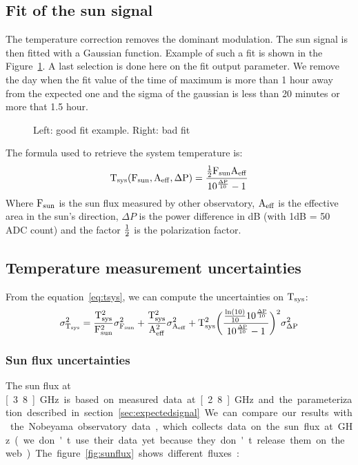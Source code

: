 \subsection{Fit of the sun signal}
The temperature  correction removes the dominant  modulation.  The sun
signal is then fitted with a  Gaussian function. Example of such a fit
is shown in the  Figure~\ref{fig:examplefit}. A last selection is done
here on the fit output parameter. We remove the day when the fit value
of the time of maximum is more  than 1 hour away from the expected one
and the sigma of the gaussian is less than 20 minutes or more that 1.5
hour.
\begin{figure}[!ht]
  \centering
  \hspace*{-3ex}
  \caption{Left: good fit example. Right: bad fit}
 \label{fig:examplefit}
\end{figure}
The formula used to retrieve the system temperature is:
\begin{equation}
  \rm
  T_{sys} (F_{sun}, A_{eff}, \Delta P) = \frac{\frac{1}{2} F_{sun} A_{eff}}{10^{\frac{\Delta P}{10}} -1 }
\label{eq:tsys}
\end{equation}
Where $\rm  F_{sun}$ is  the sun flux  measured by  other observatory,
$\rm A_{eff}$ is the effective area in the sun's direction, $\Delta P$
is the power difference in dB (with 1dB = 50 ADC count) and the factor
$\rm \frac{1}{2}$ is  the polarization factor. 

\subsection{Temperature measurement uncertainties}
From the  equation~\ref{eq:tsys}, we can compute  the uncertainties on
$\rm T_{sys}$:
\begin{equation}
  \rm       \sigma_{T_{sys}}^2      =      \frac{T_{sys}^2}{F_{sun}^2}
  \sigma_{F_{sun}}^2  + \frac{T_{sys}^2}{A_{eff}^2} \sigma_{A_{eff}}^2
  +   T_{sys}^2   \bigg(\frac{   \frac{\ln(10)}{10}   10^{\frac{\Delta
        P}{10}}}{10^{\frac{\Delta P}{10}}  - 1}\bigg)^2 \sigma_{\Delta
    P}^2
\end{equation}

\subsubsection{Sun flux uncertainties}
The  sun  flux  at  \unit[3.8]{GHz}  is  based  on  measured  data  at
\unit[2.8]{GHz}     and    the    parameterization     described    in
section~\ref{sec:expectedsignal}. We can  compare our results with the
Nobeyama  observatory data,  which collects  data on  the sun  flux at
\unit[2 and  4]{GHz} (we don't use  their data yet  because they don't
release  them   on  the  web).    The  figure~\ref{fig:sunflux}  shows
different fluxes:

